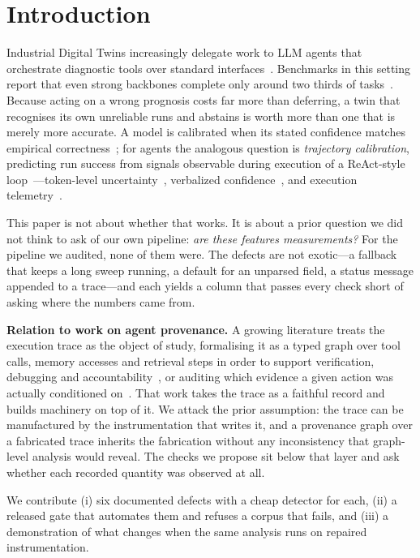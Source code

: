 \documentclass[conference]{IEEEtran}
\begin{document}
\section{Introduction}

Industrial Digital Twins increasingly delegate work to LLM agents that
orchestrate diagnostic tools over standard interfaces~\cite{mcp}. Benchmarks in
this setting report that even strong backbones complete only around two thirds
of tasks~\cite{phmforge,assetops}. Because acting on a wrong prognosis costs far
more than deferring, a twin that recognises its own unreliable runs and abstains
is worth more than one that is merely more accurate. A model is calibrated when its stated confidence matches empirical
correctness~\cite{guo}; for agents the analogous question is
\emph{trajectory calibration}, predicting run success from signals observable
during execution of a ReAct-style loop~\cite{react}---token-level uncertainty~\cite{kadavath}, verbalized
confidence~\cite{xiong}, and execution telemetry~\cite{calvert}.

This paper is not about whether that works. It is about a prior question we did
not think to ask of our own pipeline: \emph{are these features measurements?}
For the pipeline we audited, none of them were. The defects are not exotic---a
fallback that keeps a long sweep running, a default for an unparsed field, a
status message appended to a trace---and each yields a column that passes every
check short of asking where the numbers came from.

\textbf{Relation to work on agent provenance.} A growing literature treats the
execution trace as the object of study, formalising it as a typed graph over
tool calls, memory accesses and retrieval steps in order to support
verification, debugging and accountability~\cite{provsurvey}, or auditing which
evidence a given action was actually conditioned on~\cite{provaudit}. That work
takes the trace as a faithful record and builds machinery on top of it. We
attack the prior assumption: the trace can be manufactured by the
instrumentation that writes it, and a provenance graph over a fabricated trace
inherits the fabrication without any inconsistency that graph-level analysis
would reveal. The checks we propose sit below that layer and ask whether each
recorded quantity was observed at all.

We contribute (i) six documented defects with a cheap detector for each,
(ii) a released gate that automates them and refuses a corpus that fails, and
(iii) a demonstration of what changes when the same analysis runs on repaired
instrumentation.
\end{document}
